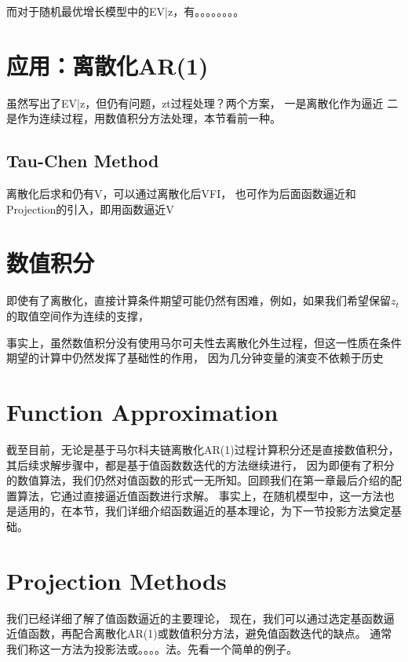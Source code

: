 而对于随机最优增长模型中的EV|z，有。。。。。。。。


\section{应用：离散化AR(1)}

虽然写出了EV|z，但仍有问题，zt过程处理？两个方案，
一是离散化作为逼近
二是作为连续过程，用数值积分方法处理，本节看前一种。



\subsection{Tau-Chen Method}


离散化后求和仍有V，可以通过离散化后VFI，
也可作为后面函数逼近和Projection的引入，即用函数逼近V



\section{数值积分}

即使有了离散化，直接计算条件期望可能仍然有困难，例如，如果我们希望保留$z_t$的取值空间作为连续的支撑，


事实上，虽然数值积分没有使用马尔可夫性去离散化外生过程，但这一性质在条件期望的计算中仍然发挥了基础性的作用，
因为几分钟变量的演变不依赖于历史


\section{Function Approximation}

截至目前，无论是基于马尔科夫链离散化AR(1)过程计算积分还是直接数值积分，其后续求解步骤中，都是基于值函数数迭代的方法继续进行，
因为即便有了积分的数值算法，我们仍然对值函数的形式一无所知。回顾我们在第一章最后介绍的配置算法，它通过直接逼近值函数进行求解。
事实上，在随机模型中，这一方法也是适用的，在本节，我们详细介绍函数逼近的基本理论，为下一节投影方法奠定基础。





\section{Projection Methods}

我们已经详细了解了值函数逼近的主要理论，
现在，我们可以通过选定基函数逼近值函数，再配合离散化AR(1)或数值积分方法，避免值函数迭代的缺点。
通常我们称这一方法为投影法或。。。。法。先看一个简单的例子。